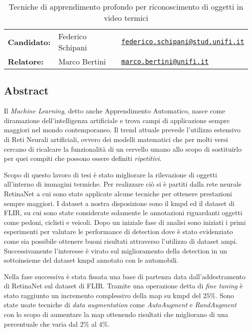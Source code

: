 \documentclass[11pt]{article}
\begin{document}
\begin{table}[]
\centering
\caption*{Tecniche di apprendimento profondo per riconoscimento di oggetti in video termici}
\begin{tabular}{lll}
\textbf{Candidato:}   & Federico Schipani & \href{mailto:federico.schipani@stud.unifi.it}{\texttt{federico.schipani@stud.unifi.it}}  \\
\textbf{Relatore:}    & Marco Bertini  & \href{mailto:marco.bertini@unifi.it}{\texttt{marco.bertini@unifi.it}}                           \\
\end{tabular}
\end{table}
\subsection*{Abstract}
Il \textit{Machine Learning}, detto anche Apprendimento Automatico, nasce come diramazione dell'intelligenza artificiale e trova campi di applicazione sempre maggiori nel mondo contemporaneo. Il trend attuale prevede l'utilizzo estensivo di Reti Neurali artificiali, ovvero dei modelli matematici che per molti versi cercano di ricalcare la funzionalità di un cervello umano allo scopo di sostituirlo per quei compiti che possono essere definiti \textit{ripetitivi}. 

Scopo di questo lavoro di tesi è stato migliorare la rilevazione di oggetti all'interno di immagini termiche. Per realizzare ciò si è partiti dalla rete neurale RetinaNet a cui sono state applicate alcune tecniche per ottenere prestazioni sempre maggiori. I dataset a nostra disposizione sono il \acrfull{kmpd} ed il dataset di FLIR, su cui sono state considerate solamente le annotazioni riguardanti oggetti come pedoni, ciclisti e veicoli. Dopo un iniziale fase di analisi sono iniziati i primi esperimenti per valutare le performance di detection dove è stato evidenziato come sia possibile ottenere buoni risultati attraverso l'utilizzo di dataset ampi. Successivamente l'interesse è virato sul miglioramento della detection in un sottoinsieme del dataset \acrshort{kmpd} annotato con le automobili.

Nella fase successiva è stata fissata una base di partenza data dall'addestramento di RetinaNet sul dataset di FLIR. Tramite una operazione detta di \textit{fine tuning} è stato raggiunto un incremento complessivo della \acrfull{map} su \acrshort{kmpd} del $25\%$. Sono state usate tecniche di \textit{data augmentation} come \textit{AutoAugment} e \textit{RandAugment} con lo scopo di aumentare la \acrshort{map} ottenendo risultati che migliorano di una percentuale che varia dal $2\%$ al $4\%$.
\end{document}
